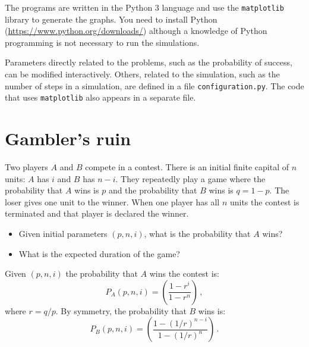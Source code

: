 \documentclass[11pt,a4paper]{article}
\begin{document}
\nocite{*}

The programs are written in the Python 3 language and use the \verb+matplotlib+ library to generate the graphs. You need to install Python (\url{https://www.python.org/downloads/}) although a knowledge of Python programming is not necessary to run the simulations.

Parameters directly related to the problems, such as the probability of success, can be modified interactively. Others, related to the simulation, such as the number of steps in a simulation, are defined in a file \verb+configuration.py+. The code that uses \verb+matplotlib+ also appears in a separate file.


\section{Gambler's ruin}\label{s.gamblers}

Two players $A$ and $B$ compete in a contest. There is an initial finite capital of $n$ units: $A$ has $i$ and $B$ has $n-i$. They repeatedly play a game where the probability that $A$ wins is $p$ and the probability that $B$ wins is $q=1-p$. The loser gives one unit to the winner. When one player has all $n$ units the contest is terminated and that player is declared the winner.
\begin{center}
\end{center}
\begin{itemize}
\item Given initial parameters $(p, n, i)$, what is the probability that $A$ wins?
\item What is the expected duration of the game?
\end{itemize}

Given $(p,n,i)$ the probability that $A$ wins the contest is:
\[
P_A(p, n, i) = \left(\frac{1-r^{i}}{1-r^n}\right)\,,
\]
where $r=q/p$. By symmetry, the probability that $B$ wins is:
\[
P_B(p, n, i) = \left(\frac{1-(1/r)^{n-i}}{1-(1/r)^{n}}\right)\,.
\]
\end{document}
